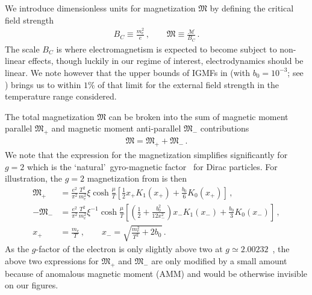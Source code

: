 We introduce dimensionless units for magnetization ${\mathfrak M}$ by defining the critical field strength
\begin{align}
 {B}_{C}\equiv\frac{m_{e}^{2}}{e}\,,\qquad{\mathfrak M}\equiv\frac{\mathcal{M}}{{B}_{C}}\,.
\end{align}
The scale ${B}_{C}$ is where electromagnetism is expected to become subject to non-linear effects, though luckily in our regime of interest, electrodynamics should be linear. We note however that the upper bounds of IGMFs in  (with $b_{0}=10^{-3}$; see ) brings us to within $1\%$ of that limit for the external field strength in the temperature range considered.

The total magnetization ${\mathfrak M}$ can be broken into the sum of magnetic moment parallel ${\mathfrak M}_{+}$ and magnetic moment anti-parallel ${\mathfrak M}_{-}$ contributions
\begin{align}
\label{g2mag}
{\mathfrak M}={\mathfrak M}_{+}+{\mathfrak M}_{-}\,.
\end{align}
We note that the expression for the magnetization simplifies significantly for $g\!=\!2$ which is the \lq natural\rq\ gyro-magnetic factor~\citep{Evans:2022fsu,Rafelski:2022bsv} for Dirac particles. For illustration, the $g\!=\!2$ magnetization from  is then
\begin{align}
 \label{g2magplus}
 {\mathfrak M}_{+}&=\frac{e^{2}}{\pi^{2}}\frac{T^{2}}{m_{e}^{2}}\xi\cosh{\frac{\mu}{T}}\left[\frac{1}{2}x_{+}K_{1}(x_{+})+\frac{b_{0}}{6}K_{0}(x_{+})\right]\,,\\
 \label{g2magminus}
 -{\mathfrak M}_{-}&=\frac{e^{2}}{\pi^{2}}\frac{T^{2}}{m_{e}^{2}}\xi^{-1}\cosh{\frac{\mu}{T}}
 \left[\left(\frac{1}{2}+\frac{b_{0}^{2}}{12x_{-}^{2}}\right)x_{-}K_{1}(x_{-})+\frac{b_{0}}{3}K_{0}(x_{-})\right]\,,\\
 x_{+}&=\frac{m_{e}}{T}\,,\qquad
 x_{-}=\sqrt{\frac{m_{e}^{2}}{T^{2}}+2b_{0}}\,.
\end{align}
As the $g$-factor of the electron is only slightly above two at $g\simeq2.00232$~\citep{Tiesinga:2021myr}, the above two expressions for ${\mathfrak M}_{+}$ and ${\mathfrak M}_{-}$ are only modified by a small amount because of anomalous magnetic moment (AMM) and would be otherwise invisible on our figures.

